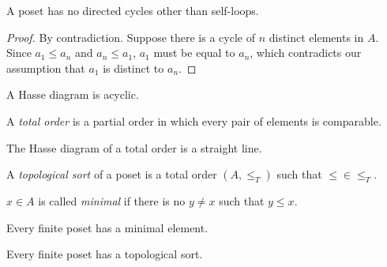 \documentclass[11pt]{article}
\begin{document}
\begin{theorem}
A poset has no directed cycles other than self-loops.
\end{theorem}

\begin{proof}
By contradiction. Suppose there is a cycle of $n$ distinct elements in $A$. Since $a_1 \leq a_n$
and $a_n \leq a_1$, $a_1$ must be equal to $a_n$, which contradicts our assumption that $a_1$ is
distinct to $a_n$.
\end{proof}

\begin{corollary}
A Hasse diagram is acyclic.
\end{corollary}

\begin{definition}
A \emph{total order} is a partial order in which every pair of elements is comparable.
\end{definition}

\begin{proposition}
The Hasse diagram of a total order is a straight line.
\end{proposition}

\begin{definition}
A \emph{topological sort} of a poset is a total order $(A,\leq_T)$ such that $\leq \in \leq_T$.
\end{definition}

\begin{definition}
$x \in A$ is called \emph{minimal} if there is no $y \neq x$ such that $y \leq x$.
\end{definition}

\begin{lemma}
Every finite poset has a minimal element.
\end{lemma}

\begin{theorem}
Every finite poset has a topological sort.
\end{theorem}
\end{document}
